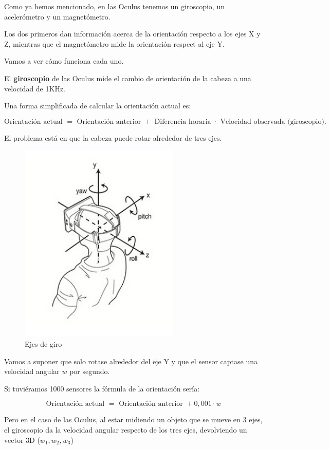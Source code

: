\documentclass[twoside, 12pt]{epstfg}
\begin{document}
Como ya hemos mencionado, en las Oculus tenemos un giroscopio, un acelerómetro y un magnetómetro.

Los dos primeros dan información acerca de la orientación respecto a los ejes X y Z, mientras que el magnetómetro mide la orientación respect al eje Y.

Vamos a ver cómo funciona cada uno.

El \textbf{giroscopio} de las Oculus mide el cambio de orientación de la cabeza a una velocidad de 1KHz.

Una forma simplificada de calcular la orientación actual es:

$$\text{Orientación actual } = \text{ Orientación anterior } + \text{ Diferencia horaria } \cdot \text{ Velocidad observada (giroscopio).}$$

El problema está en que la cabeza puede rotar alrededor de tres ejes.

\begin{figure}[h]
	\centerline{
		\mbox{\includegraphics[width=3.00in]{images/headtracking.png}}
	}
	\caption{Ejes de giro}
\end{figure}

Vamos a suponer que solo rotase alrededor del eje Y y que el sensor captase una velocidad angular $w$ por segundo.

Si tuviéramos 1000 sensores la fórmula de la orientación sería:

$$\text{Orientación actual } = \text{ Orientación anterior } + 0,001 \cdot w$$

Pero en el caso de las Oculus, al estar midiendo un objeto que se mueve en 3 ejes, el giroscopio da la velocidad angular respecto de los tres ejes, devolviendo un vector 3D ($w_1,w_2,w_3$)
\end{document}
